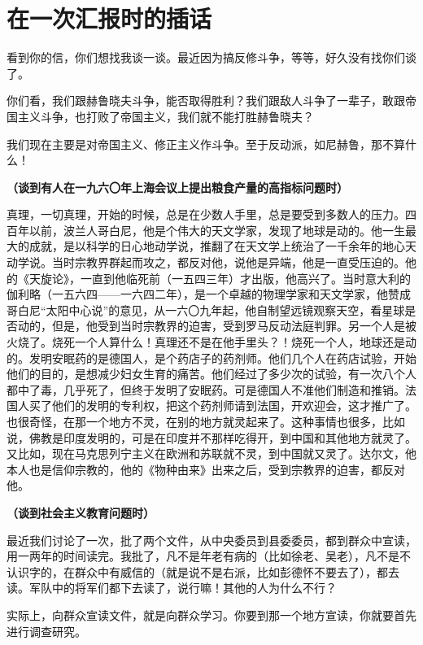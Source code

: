 \section[在一次汇报时的插话（一九六四年三月）]{在一次汇报时的插话}

看到你的信，你们想找我谈一谈。最近因为搞反修斗争，等等，好久没有找你们谈了。

你们看，我们跟赫鲁晓夫斗争，能否取得胜利？我们跟敌人斗争了一辈子，敢跟帝国主义斗争，也打败了帝国主义，我们就不能打胜赫鲁晓夫？

我们现在主要是对帝国主义、修正主义作斗争。至于反动派，如尼赫鲁，那不算什么！

\textbf{（谈到有人在一九六〇年上海会议上提出粮食产量的高指标问题时）}

真理，一切真理，开始的时候，总是在少数人手里，总是要受到多数人的压力。四百年以前，波兰人哥白尼，他是个伟大的天文学家，发现了地球是动的。他一生最大的成就，是以科学的日心地动学说，推翻了在天文学上统治了一千余年的地心天动学说。当时宗教界群起而攻之，都反对他，说他是异端，他是一直受压迫的。他的《天旋论》，一直到他临死前（一五四三年）才出版，他高兴了。当时意大利的伽利略（一五六四——一六四二年），是一个卓越的物理学家和天文学家，他赞成哥白尼“太阳中心说”的意见，从一六〇九年起，他自制望远镜观察天空，看星球是否动的，但是，他受到当时宗教界的迫害，受到罗马反动法庭判罪。另一个人是被火烧了。烧死一个人算什么！真理还不是在他手里头？！烧死一个人，地球还是动的。发明安眠药的是德国人，是个药店子的药剂师。他们几个人在药店试验，开始他们的目的，是想减少妇女生育的痛苦。他们经过了多少次的试验，有一次八个人都中了毒，几乎死了，但终于发明了安眠药。可是德国人不准他们制造和推销。法国人买了他们的发明的专利权，把这个药剂师请到法国，开欢迎会，这才推广了。也很奇怪，在那一个地方不灵，在别的地方就灵起来了。这种事情也很多，比如说，佛教是印度发明的，可是在印度并不那样吃得开，到中国和其他地方就灵了。又比如，现在马克思列宁主义在欧洲和苏联就不灵，到中国就又灵了。达尔文，他本人也是信仰宗教的，他的《物种由来》出来之后，受到宗教界的迫害，都反对他。

\textbf{（谈到社会主义教育问题时）}

最近我们讨论了一次，批了两个文件，从中央委员到县委委员，都到群众中宣读，用一两年的时间读完。我批了，凡不是年老有病的（比如徐老、吴老），凡不是不认识字的，在群众中有威信的（就是说不是右派，比如彭德怀不要去了），都去读。军队中的将军们都下去读了，说行嘛！其他的人为什么不行？

实际上，向群众宣读文件，就是向群众学习。你要到那一个地方宣读，你就要首先进行调查研究。

